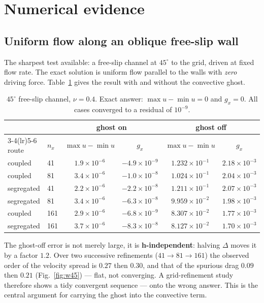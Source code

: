 \documentclass[11pt,a4paper]{article}
\begin{document}
\section{Numerical evidence}\label{sec:evidence}

\subsection{Uniform flow along an oblique free-slip wall}
The sharpest test available: a free-slip channel at $45^\circ$ to the grid, driven at fixed
flow rate. The exact solution is uniform flow parallel to the walls with \emph{zero} driving
force. Table~\ref{tab:w45} gives the result with and without the convective ghost.

\begin{table}[h]\centering
\caption{$45^\circ$ free-slip channel, $\nu=0.4$. Exact answer: $\max u-\min u=0$ and
$g_x=0$. All cases converged to a residual of $10^{-9}$.}
\label{tab:w45}
\begin{tabular}{llcccc}
\toprule
 & & \multicolumn{2}{c}{ghost on} & \multicolumn{2}{c}{ghost off}\\
\cmidrule(lr){3-4}\cmidrule(lr){5-6}
route & $n_x$ & $\max u-\min u$ & $g_x$ & $\max u-\min u$ & $g_x$\\
\midrule
coupled     & 41 & $1.9\times10^{-6}$ & $-4.9\times10^{-9}$ & $1.232\times10^{-1}$ & $2.18\times10^{-3}$\\
coupled     & 81 & $3.4\times10^{-6}$ & $-1.0\times10^{-8}$ & $1.024\times10^{-1}$ & $2.04\times10^{-3}$\\
segregated  & 41 & $2.2\times10^{-6}$ & $-2.2\times10^{-8}$ & $1.211\times10^{-1}$ & $2.07\times10^{-3}$\\
segregated  & 81 & $3.4\times10^{-6}$ & $-6.3\times10^{-8}$ & $9.959\times10^{-2}$ & $1.98\times10^{-3}$\\
coupled     & 161 & $2.9\times10^{-6}$ & $-6.8\times10^{-9}$ & $8.307\times10^{-2}$ & $1.77\times10^{-3}$\\
segregated  & 161 & $3.7\times10^{-6}$ & $-8.3\times10^{-8}$ & $8.127\times10^{-2}$ & $1.70\times10^{-3}$\\
\bottomrule
\end{tabular}
\end{table}

The ghost-off error is not merely large, it is \textbf{h-independent}: halving $\Delta$ moves
it by a factor $1.2$. Over two successive refinements ($41\to81\to161$) the observed order of
the velocity spread is $0.27$ then $0.30$, and that of the spurious drag $0.09$ then $0.21$
(Fig.~\ref{fig:w45}) --- flat, not converging. A grid-refinement study therefore shows a tidy convergent
sequence --- onto the wrong answer. This is the central argument for carrying the ghost into
the convective term.
\end{document}
